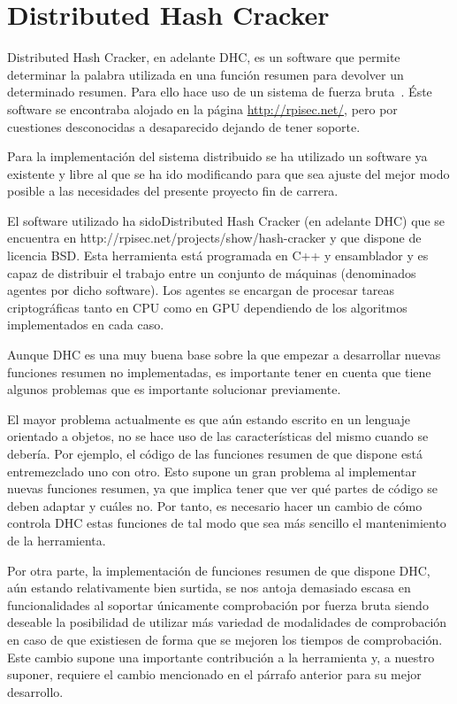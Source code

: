 \chapter{Distributed Hash Cracker}\label{cap4}

Distributed Hash Cracker, en adelante DHC, es un software que permite determinar la palabra utilizada en una función resumen para devolver un determinado resumen. Para ello hace uso de un sistema de fuerza bruta~\cite{dhc:paper}. Éste software se encontraba alojado en la página \url{http://rpisec.net/}, pero por cuestiones desconocidas a desaparecido dejando de tener soporte.

Para la implementación del sistema distribuido se ha utilizado un software ya existente y libre al que se ha ido modificando para que sea ajuste del mejor modo posible a las necesidades del presente proyecto fin de carrera.

El software utilizado ha sidoDistributed Hash Cracker (en adelante DHC) que se encuentra en http://rpisec.net/projects/show/hash-cracker y que dispone de licencia BSD. Esta herramienta está programada en C++ y ensamblador y es capaz de distribuir el trabajo entre un conjunto de máquinas (denominados agentes por dicho software). Los agentes se encargan de procesar tareas criptográficas tanto en CPU como en GPU dependiendo de los algoritmos implementados en cada caso.

Aunque DHC es una muy buena base sobre la que empezar a desarrollar nuevas funciones resumen no implementadas, es importante tener en cuenta que tiene algunos problemas que es importante solucionar previamente.

El mayor problema actualmente es que aún estando escrito en un lenguaje orientado a objetos, no se hace uso de las características del mismo cuando se debería. Por ejemplo, el código de las funciones resumen de que dispone está entremezclado uno con otro. Esto supone un gran problema al implementar nuevas funciones resumen, ya que implica tener que ver qué partes de código se deben adaptar y cuáles no. Por tanto, es necesario hacer un cambio de cómo controla DHC estas funciones de tal modo que sea más sencillo el mantenimiento de la herramienta.

Por otra parte, la implementación de funciones resumen de que dispone DHC, aún estando relativamente bien surtida, se nos antoja demasiado escasa en funcionalidades al soportar únicamente comprobación por fuerza bruta siendo deseable la posibilidad de utilizar más variedad de modalidades de comprobación en caso de que existiesen de forma que se mejoren los tiempos de comprobación. Este cambio supone una importante contribución a la herramienta y, a nuestro suponer, requiere el cambio mencionado en el párrafo anterior para su mejor desarrollo.

